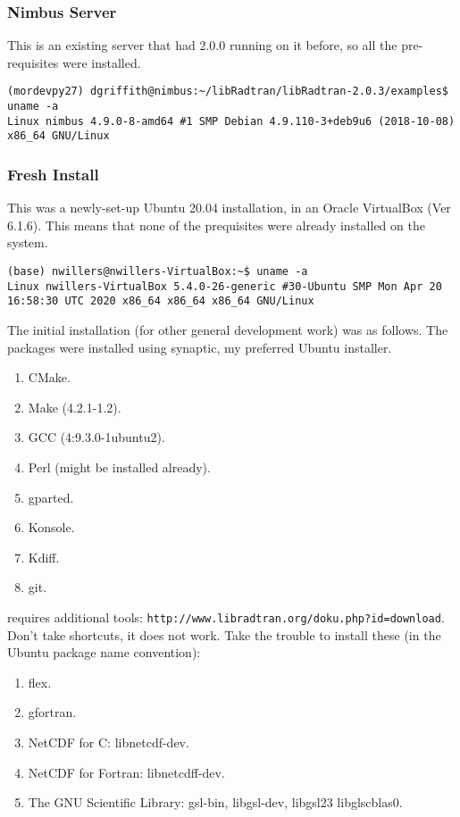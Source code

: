 \subsubsection{Nimbus Server}
This is an existing server that had \libradtran{} 2.0.0 running on it before, so all the pre-requisites were installed.  

\begin{lstlisting}[style=tinysize]
(mordevpy27) dgriffith@nimbus:~/libRadtran/libRadtran-2.0.3/examples$ uname -a
Linux nimbus 4.9.0-8-amd64 #1 SMP Debian 4.9.110-3+deb9u6 (2018-10-08) x86_64 GNU/Linux
\end{lstlisting}

\subsubsection{Fresh Install}

This was a newly-set-up Ubuntu 20.04 installation, in an Oracle VirtualBox (Ver 6.1.6).  This means that none of the prequisites were already installed on the system.

\begin{lstlisting}[style=tinysize]
(base) nwillers@nwillers-VirtualBox:~$ uname -a 
Linux nwillers-VirtualBox 5.4.0-26-generic #30-Ubuntu SMP Mon Apr 20 16:58:30 UTC 2020 x86_64 x86_64 x86_64 GNU/Linux
\end{lstlisting}

The initial installation (for other general development work) was as follows. The packages were installed using synaptic, my preferred Ubuntu installer.

\begin{enumerate}
\itemsep-0.5em 
\item CMake.
\item Make (4.2.1-1.2).
\item GCC (4:9.3.0-1ubuntu2).
\item Perl (might be installed already).
\item gparted.
\item Konsole.
\item Kdiff.
\item git.
\end{enumerate}

\libradtran{} requires additional tools: \lstinline{http://www.libradtran.org/doku.php?id=download}.
Don't take shortcuts, it does not work. Take the trouble to install these (in the Ubuntu package name convention):

\begin{enumerate}
\itemsep-0.5em 
\item flex.
\item gfortran.
\item NetCDF for C: libnetcdf-dev.
\item NetCDF for Fortran: libnetcdff-dev.
\item The GNU Scientific Library: gsl-bin, libgsl-dev, libgsl23 libglscblas0.
\end{enumerate}


